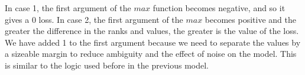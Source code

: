 \documentclass[12pt]{article}
\begin{document}
In case 1, the first argument of the $max$ function becomes negative, and so it gives a 0 loss. In case 2, the first argument of the $max$ becomes positive and the greater the difference in the ranks and values, the greater is the value of the loss.\\

We have added 1 to the first argument because we need to separate the values by a sizeable margin to reduce ambiguity and the effect of noise on the model. This is similar to the logic used before in the previous model.\\
%


\end{document}
